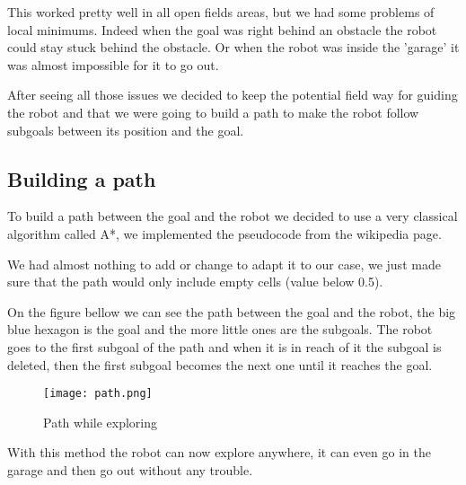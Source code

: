 This worked pretty well in all open fields areas, but we had some problems of local minimums.
Indeed when the goal was right behind an obstacle the robot could stay stuck behind the obstacle.
Or when the robot was inside the 'garage' it was almost impossible for it to go out.

After seeing all those issues we decided to keep the potential field way for guiding the robot and that we were going to build a path to make the robot follow subgoals between its position and the goal.

\subsection{Building a path}

To build a path between the goal and the robot we decided to use a very classical algorithm called A*, we implemented the pseudocode from the wikipedia page.

We had almost nothing to add or change to adapt it to our case, we just made sure that the path would only include empty cells (value below 0.5).

On the figure bellow we can see the path between the goal and the robot, the big blue hexagon is the goal and the more little ones are the subgoals.
The robot goes to the first subgoal of the path and when it is in reach of it the subgoal is deleted, then the first subgoal becomes the next one until it reaches the goal.

\begin{figure}[h]
    \centering\texttt{[image: path.png]}
    \label{fig:path}
    \caption{Path while exploring}
\end{figure}

With this method the robot can now explore anywhere, it can even go in the garage and then go out without any trouble.
